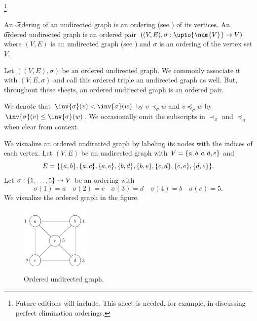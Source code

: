 
\footnote{Future editions will include. This sheet is needed, for example, in discussing perfect elimination orderings.}


An \t{ordering} of an undirected graph is an ordering (see ) of its vertices.
An \t{ordered undirected graph} is an ordered pair $((V, E), \sigma: \upto{\num{V}} \to V)$ where $(V, E)$ is an undirected graph (see ) and $\sigma$ is an ordering of the vertex set $V$.


Let $((V, E), \sigma)$ be an ordered undirected graph.
We commonly associate it with $(V, E, \sigma)$ and call this ordered triple an undirected graph as well.
But, throughout these sheets, an ordered undirected graph is an ordered pair.

We denote that $\inv{\sigma}(v) < \inv{\sigma}(w)$ by $v \prec_{\sigma} w$ and $v \preceq_{\sigma} w$ by $\inv{\sigma}(v) \leq \inv{\sigma}(w)$.
We occasionally omit the subscripts in $\prec_{\sigma}$ and $\preceq_{\sigma}$ when clear from context.



We visualize an ordered undirected graph by labeling its nodes with the indices of each vertex.
Let $(V, E)$ be an undirected graph with $V = \{a,b,c,d,e\}$ and
\[
  E = \set*{\set{a, b}, \set{a, c}, \set{a, e}, \set{b, d}, \set{b, e}, \set{c, d}, \set{c, e}, \set{d,e}}.
\]
Let $\sigma: \{1, \dots, 5\} \to V$ be an ordering with
\[
  \sigma(1) = a \quad  \sigma(2) = c \quad \sigma(3) = d \quad \sigma(4) = b \quad \sigma(e) = 5.
\]
We visualize the ordered graph in the figure.

\begin{figure}
  \centering
  \includegraphics[width=0.3\textwidth]{graphics_included/ordered_undirected_graph}
  \caption{Ordered undirected graph.}
\end{figure}
